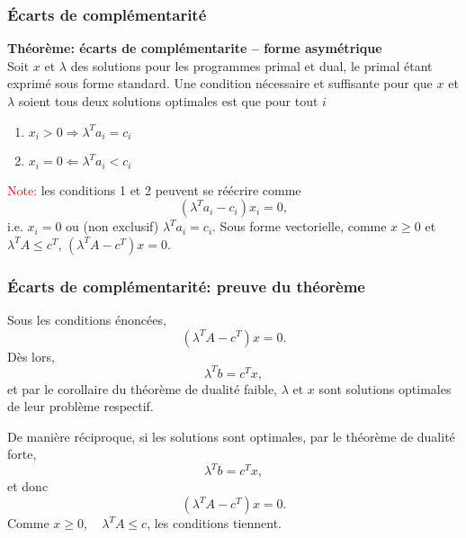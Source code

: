 \documentclass[usepdftitle=false]{beamer}
\begin{document}
\begin{frame}
	\frametitle{\'Ecarts de complémentarité}
	
	{\bf Théorème: écarts de complémentarite -- forme asymétrique}\\
	Soit $x$ et $\lambda$ des solutions pour les programmes primal et dual, le primal étant exprimé sous forme standard. Une condition nécessaire et suffisante pour que $x$ et $\lambda$ soient tous deux solutions optimales est que pour tout $i$
	\begin{enumerate}
		\item
		$x_i > 0 \Rightarrow \lambda^T a_i = c_i$
		\item
		$x_i = 0 \Leftarrow \lambda^T a_i < c_i$
	\end{enumerate}
	
	\mbox{}
	
	\textcolor{red}{Note:} les conditions 1 et 2 peuvent se réécrire comme
	$$
	(\lambda^T a_i - c_i)x_i = 0,
	$$
	i.e. $x_i = 0$ ou (non exclusif) $\lambda^T a_i = c_i$. Sous forme vectorielle, comme $x \geq 0$ et $\lambda^T A \leq c^T$, $(\lambda^T A - c^T)x = 0$.
	
\end{frame}

\begin{frame}
	\frametitle{\'Ecarts de complémentarité: preuve du théorème}
	
	Sous les conditions énoncées,
	\[
	(\lambda^T A - c^T)x = 0.
	\]
	Dès lors,
	\[
	\lambda^T b = c^Tx,
	\]
	et par le corollaire du théorème de dualité faible, $\lambda$ et $x$ sont solutions optimales de leur problème respectif.
	
	\mbox{}
	
	De manière réciproque, si les solutions sont optimales, par le théorème de dualité forte,
	\[
	\lambda^T b = c^Tx,
	\]
	et donc
	\[
	(\lambda^T A - c^T) x = 0.
	\]
	Comme
	$x \geq 0,\quad \lambda^T A \leq c$,
	les conditions tiennent.
	
\end{frame}
\end{document}
